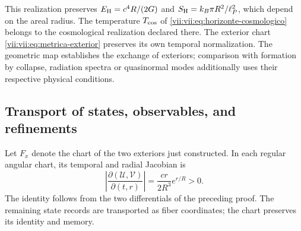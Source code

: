 This realization preserves
\(E_{\rm H}=c^4R/(2G)\) and
\(S_{\rm H}=k_B\pi R^2/\ell_P^2\), which depend on the areal radius.
The temperature \(T_{\rm cos}\) of
\eqref{vii:vii:eq:horizonte-cosmologico} belongs to the cosmological
realization declared there. The exterior chart
\eqref{vii:vii:eq:metrica-exterior} preserves its own temporal normalization.
The geometric map establishes the exchange of exteriors; comparison
with formation by collapse, radiation spectra or quasinormal modes
additionally uses their respective physical conditions.

\subsection{Transport of states, observables, and refinements}
\label{vii:vii:subsec:transporte-informacion-horizonte}

Let \(F_x\) denote the chart of the two exteriors just constructed.
In each regular angular chart, its temporal and radial Jacobian is
\begin{equation}
 \left|\frac{\partial(\mathcal U,\mathcal V)}{\partial(t,r)}\right|
 =\frac{cr}{2R^3}e^{r/R}>0.
 \label{vii:vii:eq:jacobiano-kruskal}
\end{equation}
The identity follows from the two differentials of the preceding proof.
The remaining state records are transported as fiber
coordinates; the chart preserves its identity and memory.

